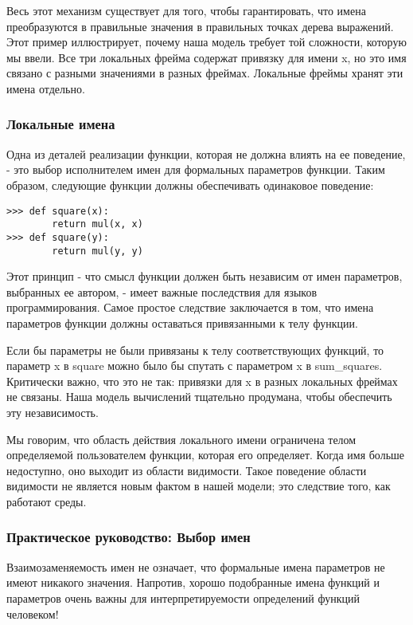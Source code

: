 Весь этот механизм существует для того, чтобы гарантировать, что имена преобразуются в правильные значения в правильных точках дерева выражений.
Этот пример иллюстрирует, почему наша модель требует той сложности, которую мы ввели.
Все три локальных фрейма содержат привязку для имени x, но это имя связано с разными значениями в разных фреймах. Локальные фреймы хранят эти имена отдельно.

\subsubsection{Локальные имена}
Одна из деталей реализации функции, которая не должна влиять на ее поведение, - это выбор исполнителем имен для формальных параметров функции. Таким образом, следующие функции должны обеспечивать одинаковое поведение:
\begin{verbatim}
>>> def square(x):
        return mul(x, x)
>>> def square(y):
        return mul(y, y)
\end{verbatim}

Этот принцип - что смысл функции должен быть независим от имен параметров, выбранных ее автором, - имеет важные последствия для языков программирования.
Самое простое следствие заключается в том, что имена параметров функции должны оставаться привязанными к телу функции.

Если бы параметры не были привязаны к телу соответствующих функций, то параметр x в square можно было бы спутать с параметром x в sum_squares.
Критически важно, что это не так: привязки для x в разных локальных фреймах не связаны. Наша модель вычислений тщательно продумана, чтобы обеспечить эту независимость.

Мы говорим, что область действия локального имени ограничена телом определяемой пользователем функции, которая его определяет.
Когда имя больше недоступно, оно выходит из области видимости. Такое поведение области видимости не является новым фактом в нашей модели; это следствие того, как работают среды.

\subsubsection{Практическое руководство: Выбор имен}
Взаимозаменяемость имен не означает, что формальные имена параметров не имеют никакого значения.
Напротив, хорошо подобранные имена функций и параметров очень важны для интерпретируемости определений функций человеком!

